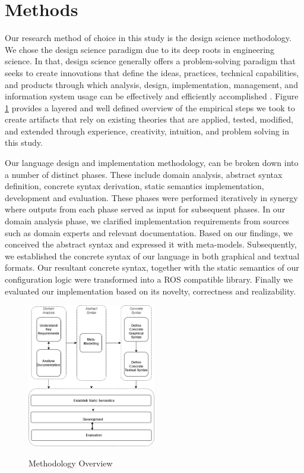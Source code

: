 \documentclass[conference]{IEEEtran}
\begin{document}
\section{Methods}
Our research method of choice in this study is the design science methodology. We chose the design science paradigm due to its deep roots in engineering science. In that, design science generally offers a problem-solving paradigm that seeks to create innovations that define the ideas, practices, technical capabilities, and products through which analysis, design, implementation, management, and information system usage can be effectively and efficiently accomplished  \cite{des-res}. Figure \ref{methover} provides a layered and well defined overview of the empirical steps we took to create artifacts that rely on existing theories that are applied, tested, modified, and extended through experience, creativity, intuition, and problem solving in this study.

Our language design and implementation methodology, can be broken down into a number of distinct phases. These include domain analysis, abstract syntax definition, concrete syntax derivation, static semantics implementation, development and evaluation. These phases were performed iteratively in synergy where outputs from each phase served as input for subsequent phases. In our domain analysis phase, we clarified implementation requirements from sources such as domain experts and relevant documentation. Based on our findings, we conceived the abstract syntax and expressed it with meta-models. Subsequently, we established the concrete syntax of our language in both graphical and textual formats. Our resultant concrete syntax, together with the static semantics of our configuration logic were transformed into a ROS compatible library. Finally we evaluated our implementation based on its novelty, correctness and realizability.

\begin{figure}[H]
\caption{Methodology Overview}
\centering
\includegraphics[width=0.5\textwidth]{diagrams/methods.png}
\label{methover}
\end{figure}
\end{document}
